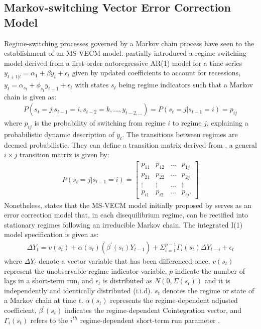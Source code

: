 \documentclass[a4paper]{article}
\theoremstyle{plain}
\theoremstyle{definition}
\theoremstyle{remark}
\begin{document}
\subsection{Markov-switching Vector Error Correction Model}\label{markov}
Regime-switching processes governed by a Markov chain process have seen to the establishment of an MS-VECM model. \cite{hamilton2013advances} partially introduced a regime-switching model derived from a first-order autoregressive AR(1) model for a time series $y_{t+1|t} = \alpha_{1} +\beta y_{t} + \epsilon_{t} $ given by updated coefficients to account for recessions, $y_{t} = \alpha_{s_{t}} + \phi_{s_{t}}y_{t-1} + \epsilon_{t}$ with states $s_{t}$ being regime indicators such that a Markov chain is given as:
\begin{align}
    P(s_{t} = j | s_{t-1} = i, s_{t-2} =k,...,y_{t-2,...}) = P(s_{t} = j | s_{t-1} = i) = p_{ij}
\end{align}
where $p_{ij}$ is the probability of switching from regime $i$ to regime $j$, explaining a probabilistic dynamic description of $y_{t}.$ The transitions between regimes are deemed probabilistic. They can define a transition matrix derived from \cite{chung1960transition}, a general $i \times j$ transition matrix is given by:
\begin{align*}
    P(s_{t} = j | s_{t-1} = i) = \begin{bmatrix}
        p_{11} & p_{12} & \hdots & p_{1j} \\
        p_{21} & p_{22} & \hdots & p_{2j} \\
        \vdots & \vdots & \hdots & \vdots \\
        p_{i1} & p_{i2} & \hdots & p_{ij}.
    \end{bmatrix}
\end{align*}
Nonetheless, \cite{phoong2014linear} states that the MS-VECM model initially proposed by \cite{krolzig1996statistical} serves as an error correction model that, in each disequilibrium regime, can be rectified into stationary regimes following an irreducible Markov chain. The integrated I(1) model specification is given as:
\begin{align}\label{MS-VECM}
    \Delta Y_{t} = v(s_{t}) + \alpha(s_{t})(\beta^{'}(s_{t})Y_{t-1}) + \Sigma^{p-1}_{i=1} \Gamma_{i}(s_{t})\Delta Y_{t-i} + \epsilon_{t}
\end{align}
where $\Delta Y_{t}$ denote a vector variable that has been differenced once, $v(s_{t})$ represent the unobservable regime indicator variable, $p$ indicate the number of lags in a short-term run, and $\epsilon_{t}$ is distributed as $N(0,\Sigma (s_{t}))$ and it is independently and identically distributed (i.i.d). $s_{t}$ denotes the regime or state of a Markov chain at time $t$. $\alpha(s_{t})$ represents the regime-dependent adjusted coefficient, $\beta^{'}(s_{t})$ indicates the regime-dependent Cointegration vector, and $\Gamma_{i}(s_{t})$ refers to the $i^{th}$ regime-dependent short-term run parameter \citep{phoong2013markov, hamilton2013advances}. 
\end{document}
